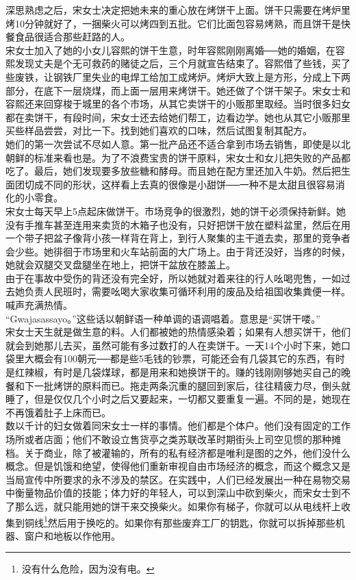 深思熟虑之后，宋女士决定把她未来的重心放在烤饼干上面。饼干只需要在烤炉里烤10分钟就好了，一捆柴火可以烤四到五批。它们比面包容易烤熟，而且饼干是快餐食品很适合那些赶路的人。\\

宋女士加入了她的小女儿容熙的饼干生意，时年容熙刚刚离婚──她的婚姻，在容熙发现丈夫是个无可救药的赌徒之后，三个月就宣告结束了。容熙借了些钱，买了些废铁，让钢铁厂里失业的电焊工给加工成烤炉。烤炉大致上是方形，分成上下两部分，在底下一层烧煤，而上面一层用来烤饼干。她还做了个饼干架子。宋女士和容熙还来回穿梭于城里的各个市场，从其它卖饼干的小贩那里取经。当时很多妇女都在卖饼干，有段时间，宋女士还去给她们帮工，边看边学。她也从其它小贩那里买些样品尝尝，对比一下。找到她们喜欢的口味，然后试图复制其配方。\\

她们的第一次尝试不尽如人意。第一批产品还不适合拿到市场去销售，即使是以北朝鲜的标准来看也是。为了不浪费宝贵的饼干原料，宋女士和女儿把失败的产品都吃了。最后，她们发现要多放些糖和酵母。而且她在配方里还加入牛奶。然后把生面团切成不同的形状，这样看上去真的很像是小甜饼──一种不是太甜且很容易消化的小零食。\\

宋女士每天早上5点起床做饼干。市场竞争的很激烈，她的饼干必须保持新鲜。她没有手推车甚至连用来卖货的木箱子也没有，只好把饼干放在塑料盆里，然后在用一个带子把盆子像背小孩一样背在背上，到行人聚集的主干道去卖，那里的竞争者会少些。她徘徊于市场里和火车站前面的大广场上。由于背还没好，当疼的时候，她就会双腿交叉盘腿坐在地上，把饼干盆放在膝盖上。\\

由于在事故中受伤的背还没有完全好，所以她就对着来往的行人吆喝兜售，一如过去她负责人民班时，需要吆喝大家收集可循环利用的废品及给祖国收集粪便一样。喊声充满热情。\\

“Gwajasassayo。”这些话以朝鲜语一种单调的语调唱着。意思是“买饼干喽。”\\

宋女士天生就是做生意的料。人们都被她的热情感染着；如果有人想买饼干，他们就会到她那儿去买，虽然可能有多过数打的人在卖饼干。一天14个小时下来，她口袋里大概会有100朝元──都是些5毛钱的钞票，可能还会有几袋其它的东西，有时是红辣椒，有时是几袋煤球，都是用来和她换饼干的。赚的钱刚刚够她买自己的晚餐和下一批烤饼的原料而已。拖走两条沉重的腿回到家后，往往精疲力尽，倒头就睡了，但是仅仅几个小时之后又要起来，一切都又要重复一遍。不同的是，她现在不再饿着肚子上床而已。\\

数以千计的妇女做着同宋女士一样的事情。他们都是个体户。他们没有固定的工作场所或者店面；他们不敢设立售货亭之类苏联改革时期街头上司空见惯的那种摊档。关于商业，除了被灌输的，所有的私有经济都是唯利是图的之外，他们没什么概念。但是饥饿和绝望，使得他们重新审视自由市场经济的概念，而这个概念又是当局宣传中所要求的永不涉及的禁区。在实践中，人们已经发展出一种在易物交易中衡量物品价值的技能；体力好的年轻人，可以到深山中砍到柴火，而宋女士到不了那么远，就只能用她的饼干来交换柴火。如果你有梯子，你就可以从电线杆上收集到铜线\footnote{没有什么危险，因为没有电。}然后用于换吃的。如果你有那些废弃工厂的钥匙，你就可以拆掉那些机器、窗户和地板以作他用。\\

